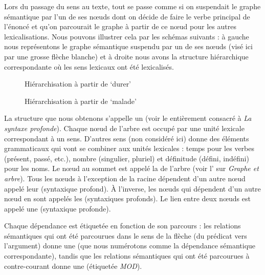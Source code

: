 Lors du passage du sens au texte, tout se passe comme si on suspendait le graphe sémantique par l’un de ses nœuds dont on décide de faire le verbe principal de l’énoncé et qu’on parcourait le graphe à partir de ce nœud pour les autres lexicalisations. Nous pouvons illustrer cela par les schémas suivants : à gauche nous représentons le graphe sémantique suspendu par un de ses nœuds (visé ici par une grosse flèche blanche) et à droite nous avons la structure hiérarchique correspondante où les sens lexicaux ont été lexicalisés.

\begin{figure}


\caption{\label{fig:}Hiérarchisation à partir de ‘durer’}

\end{figure}

\begin{figure}


\caption{\label{fig:}Hiérarchisation à partir de ‘malade’}
\end{figure}

La structure que nous obtenons s’appelle un  (voir le  entièrement consacré à \textit{La syntaxe profonde}). Chaque nœud de l’arbre est occupé par une unité lexicale correspondant à un sens. D’autres sens (non considéré ici) donne des éléments grammaticaux qui vont se combiner aux unités lexicales : temps pour les verbes (présent, passé, etc.), nombre (singulier, pluriel) et définitude (défini, indéfini) pour les noms. Le nœud au sommet est appelé la  de l’arbre (voir l’ sur \textit{Graphe et arbre}). Tous les nœuds à l’exception de la racine dépendent d’un autre nœud appelé leur  (syntaxique profond). À l’inverse, les nœuds qui dépendent d’un autre nœud en sont appelés les  (syntaxiques profonds). Le lien entre deux nœuds est appelé une  (syntaxique profonde).

Chaque dépendance est étiquetée en fonction de son parcours : les relations sémantiques qui ont été parcourues dans le sens de la flèche (du prédicat vers l’argument) donne une  (que nous numérotons comme la dépendance sémantique correspondante), tandis que les relations sémantiques qui ont été parcourues à contre-courant donne une  (étiquetée \textit{MOD}).

